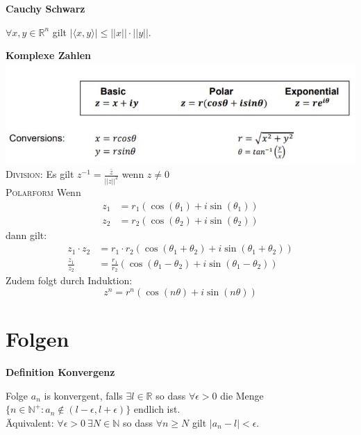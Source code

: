 \documentclass[25pt]{sciposter}
\newcommand{\R}{\mathbb{R}}
\newcommand{\N}{\mathbb{N}}
\newenvironment{method}[1]{\begin{mdframed}[backgroundcolor=blue!10,innertopmargin=15pt, innerbottommargin=15pt, nobreak=true]
		\textbf{#1 }
	}
	{ 
	\end{mdframed}
}
\begin{document}
\begin{multicols}{3}
\begin{method}{Cauchy Schwarz}
$\forall x,y\in \R^n$ gilt $|\langle x,y\rangle| \leq ||x||\cdot||y||$.
\end{method}


\begin{method}{Komplexe Zahlen}\\
\includegraphics[scale=1.4]{complex.jpg}\\
\textsc{Division:} Es gilt $z^{-1} = \frac{\bar{z}}{||z||^2}$ wenn $z \not = 0$\\
\textsc{Polarform} Wenn \begin{align*}
z_1 &= r_1(\cos(\theta_1) + i\sin(\theta_1))\\
z_2 &= r_2(\cos(\theta_2) + i\sin(\theta_2))
\end{align*}
dann gilt: 
\begin{align*}
z_1 \cdot z_2 &= r_1 \cdot r_2 \left(\cos(\theta_1 + \theta_2) + i\sin(\theta_1 + \theta_2)\right)\\
\frac{z_1}{z_2} &= \frac{r_1}{r_2}\left(\cos(\theta_1 - \theta_2) + i\sin(\theta_1 - \theta_2)\right)
\end{align*}
Zudem folgt durch Induktion:
$$z^n = r^n (\cos(n\theta) + i \sin(n \theta))$$
\end{method}






\section{Folgen}

\begin{method}{Definition Konvergenz}
Folge $a_n$ is konvergent, falls $\exists l \in \mathbb{R}$ so dass $\forall \epsilon > 0$ die Menge $\{n \in \mathbb{N}^+: a_n \not \in (l-\epsilon, l + \epsilon)\}$ endlich ist. \\
Äquivalent: $\forall \epsilon > 0 \ \exists N \in \N $ so dass $ \forall n \geq N$ gilt $|a_n - l|< \epsilon$.
\end{method}


\end{multicols}
\end{document}
